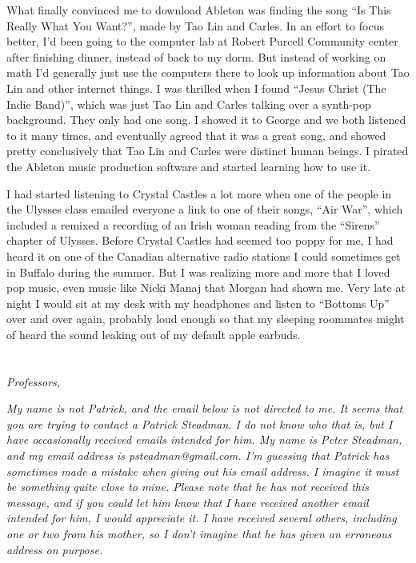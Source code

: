What finally convinced me to download Ableton was finding the song ``Is This
Really What You Want?'', made by Tao Lin and Carles.  In an effort to focus
better, I'd been going to the computer lab at Robert Purcell Community center
after finishing dinner, instead of back to my dorm.  But instead of working on
math I'd generally just use the computers there to look up information about Tao
Lin and other internet things.  I was thrilled when I found ``Jesus Christ (The
Indie Band)'', which was just Tao Lin and Carles talking over a synth-pop
background.  They only had one song.  I showed it to George and we both listened
to it many times, and eventually agreed that it was a great song, and showed
pretty conclusively that Tao Lin and Carles were distinct human beings.  I
pirated the Ableton music production software and started learning how to use
it.  

I had started listening to Crystal Castles a lot more when one of the people in
the Ulysses class emailed everyone a link to one of their songs, ``Air War'',
which included a remixed a recording of an Irish woman reading from the
``Sirens'' chapter of Ulysses.  Before Crystal Castles had seemed too poppy for
me, I had heard it on one of the Canadian alternative radio stations I could
sometimes get in Buffalo during the summer.  But I was realizing more and more
that I loved pop music, even music like Nicki Manaj that Morgan had shown me.
Very late at night I would sit at my desk with my headphones and listen to
``Bottoms Up'' over and over again, probably loud enough so that my sleeping
roommates might of heard the sound leaking out of my default apple earbuds.


\section{}

\textit{Professors,}

\textit{My name is not Patrick, and the email below is not directed to me.  It seems
that you are trying to contact a Patrick Steadman.  I do not know who that is,
but I have occasionally received emails intended for him.  My name is Peter
Steadman, and my email address is psteadman@gmail.com.  I'm guessing that
Patrick has sometimes made a mistake when giving out his email address.  I
imagine it must be something quite close to mine.  Please note that he has not
received this message, and if you could let him know that I have received
another email intended for him, I would appreciate it.  I have received
several others, including one or two from his mother, so I don't imagine that
he has given an erroneous address on purpose.
}

